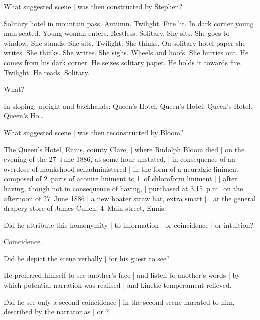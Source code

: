 
What suggested scene |
was then constructed by Stephen?

\Stephen
Solitary hotel in mountain pass.
Autumn.
Twilight.
Fire lit.
In dark corner young man seated.
Young woman enters.
Restless.
Solitary.
She sits.
She goes to window.
She stands.
She sits.
Twilight.
She thinks.
On solitary hotel paper she writes.
She thinks.
She writes.
She sighs.
Wheels and hoofs.
She hurries out.
He comes from his dark corner.
He seizes solitary paper.
He holds it towards fire.
Twilight.
He reads.
Solitary.



What?

\Stephen
In sloping, upright and backhands:
Queen's Hotel, Queen's Hotel, Queen's Hotel.
Queen's Ho…



What suggested scene |
was then reconstructed by Bloom?

\Memories
The Queen's Hotel, Ennis, county Clare, |
where Rudolph Bloom
died |
on the evening of the 27~June 1886,
at some hour unstated, |
in consequence of an overdose of monkshood
selfadministered |
in the form of a neuralgic liniment |
composed of 2~parts of aconite liniment
to 1~of chloroform liniment |
 |
after having, though not in consequence of having, |
purchased at 3.15~p.m.\ on the afternoon of 27~June 1886 |
a new boater straw hat, extra smart |
 |
at the general drapery store of
James Cullen, 4~Main street, Ennis.


Did he attribute this homonymity |
to information |
or coincidence |
or intuition?

\Factual
Coincidence.


Did he depict the scene verbally |
for his guest to see?

\Philosophy
He preferred himself to see another's face |
and listen to another's words |
by which potential narration was realised |
and kinetic temperament relieved.



Did he see only a second coincidence |
in the second scene narrated to him, |
described by the narrator as  |
or ?

